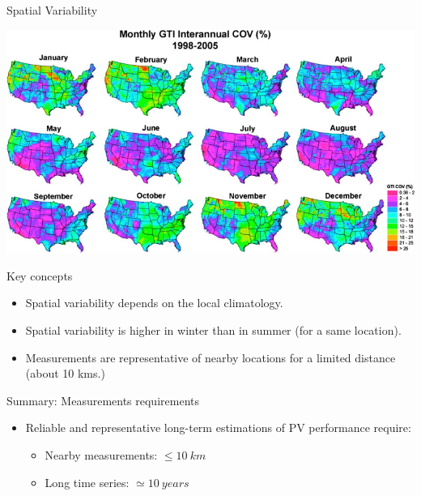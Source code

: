 \documentclass[xcolor={usenames,svgnames,dvipsnames}]{beamer}
\begin{document}
\begin{frame}[label={sec:orga5ea8de}]{Spatial Variability}
\begin{center}
\includegraphics[height=0.4\textheight]{../figs/SpatialVariability.jpg}
\end{center}

\begin{block}{Key concepts}
\begin{itemize}
\item Spatial variability depends on the \alert{local climatology}.
\item Spatial variability is \alert{higher in winter than in summer} (for a same location).
\item Measurements are representative of nearby locations for a \alert{limited distance} (about 10 kms.)
\end{itemize}
\end{block}
\end{frame}

\begin{frame}[label={sec:org315e6c8}]{Summary: Measurements requirements}
\begin{itemize}
\item Reliable and representative long-term estimations of PV performance require:
\begin{itemize}
\item \alert{Nearby measurements}: \(\leq \SI{10}{km}\)
\item \alert{Long time series}: \(\simeq \SI{10}{years}\)
\end{itemize}
\end{itemize}
\end{frame}
\end{document}
